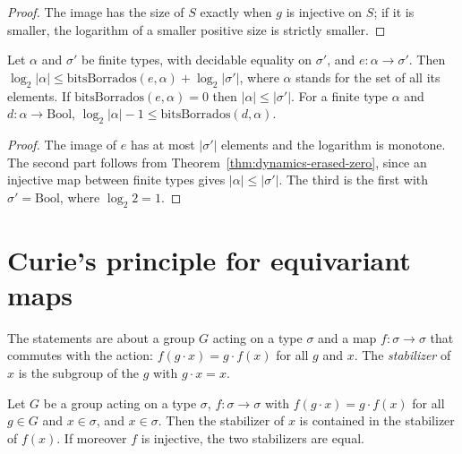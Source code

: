 \begin{proof}
  \leanok
  The image has the size of $S$ exactly when $g$ is injective on $S$; if it is smaller, the
  logarithm of a smaller positive size is strictly smaller.
\end{proof}

\begin{theorem}
  \label{thm:dynamics-erase-or-keep}
  \leanok
  Let $\alpha$ and $\sigma'$ be finite types, with decidable equality on $\sigma'$, and
  $e : \alpha \to \sigma'$. Then
  $\log_2 |\alpha| \le \mathrm{bitsBorrados}(e, \alpha) + \log_2 |\sigma'|$, where $\alpha$ stands
  for the set of all its elements. If $\mathrm{bitsBorrados}(e, \alpha) = 0$ then
  $|\alpha| \le |\sigma'|$. For a finite type $\alpha$ and $d : \alpha \to \mathrm{Bool}$,
  $\log_2 |\alpha| - 1 \le \mathrm{bitsBorrados}(d, \alpha)$.
  \own{}
\end{theorem}

\begin{proof}
  \leanok
  The image of $e$ has at most $|\sigma'|$ elements and the logarithm is monotone. The second part
  follows from Theorem~\ref{thm:dynamics-erased-zero}, since an injective map between finite types
  gives $|\alpha| \le |\sigma'|$. The third is the first with $\sigma' = \mathrm{Bool}$, where
  $\log_2 2 = 1$.
\end{proof}

\section{Curie's principle for equivariant maps}
\label{sec:dynamics-curie}

The statements are about a group $G$ acting on a type $\sigma$ and a map $f : \sigma \to \sigma$
that commutes with the action: $f(g \cdot x) = g \cdot f(x)$ for all $g$ and $x$. The
\emph{stabilizer} of $x$ is the subgroup of the $g$ with $g \cdot x = x$.

\begin{theorem}
  \label{thm:dynamics-curie}
  \leanok
  Let $G$ be a group acting on a type $\sigma$, $f : \sigma \to \sigma$ with
  $f(g \cdot x) = g \cdot f(x)$ for all $g \in G$ and $x \in \sigma$, and $x \in \sigma$. Then the
  stabilizer of $x$ is contained in the stabilizer of $f(x)$. If moreover $f$ is injective, the two
  stabilizers are equal.
  \own{}
\end{theorem}

